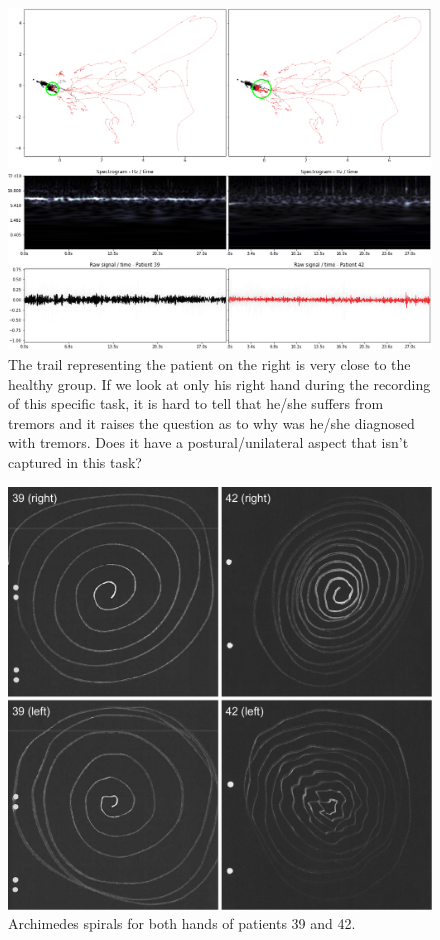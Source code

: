 \begin{figure}[ht]
\centering
\includegraphics[width=\linewidth]{figures/nemo/exp1-3942.png}
\caption{The trail representing the patient on the right is very close to the healthy group. If we look at only his right hand during the recording of this specific task, it is hard to tell that he/she suffers from tremors and it raises the question as to why was he/she diagnosed with tremors. Does it have a postural/unilateral aspect that isn't captured in this task? }
\label{fig:exp1-3942}
\end{figure}

\begin{figure}[ht]
\centering
\includegraphics[width=.7\linewidth]{figures/nemo/4-spirals.pdf}
\caption{Archimedes spirals for both hands of patients 39 and 42.}
\label{fig:spirals}
\end{figure}
    
